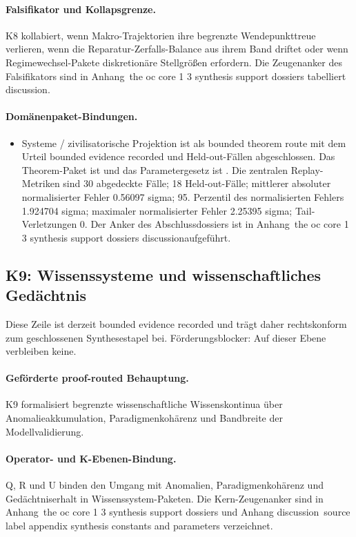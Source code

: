 \paragraph{Falsifikator und Kollapsgrenze.}
K8 kollabiert, wenn Makro-Trajektorien ihre begrenzte Wendepunkttreue verlieren, wenn die Reparatur-Zerfalls-Balance aus ihrem Band driftet oder wenn Regimewechsel-Pakete diskretionäre Stellgrößen erfordern.
Die Zeugenanker des Falsifikators sind in Anhang~the oc core 1 3 synthesis support dossiers tabelliert discussion.

\paragraph{Domänenpaket-Bindungen.}
\begin{itemize}[leftmargin=1.6em,nosep]
\item Systeme / zivilisatorische Projektion ist als bounded theorem route mit dem Urteil bounded evidence recorded und  Held-out-Fällen abgeschlossen. Das Theorem-Paket ist  und das Parametergesetz ist . Die zentralen Replay-Metriken sind 30 abgedeckte Fälle; 18 Held-out-Fälle; mittlerer absoluter normalisierter Fehler 0.56097 sigma; 95. Perzentil des normalisierten Fehlers 1.924704 sigma; maximaler normalisierter Fehler 2.25395 sigma; Tail-Verletzungen 0. Der Anker des Abschlussdossiers ist in Anhang~the oc core 1 3 synthesis support dossiers discussionaufgeführt.
\end{itemize}

\subsection{K9: Wissenssysteme und wissenschaftliches Gedächtnis}
\label{sec:oc-core-1-3-synthesis-k9}
Diese Zeile ist derzeit bounded evidence recorded und trägt daher rechtskonform zum geschlossenen Synthesestapel bei.
Förderungsblocker: Auf dieser Ebene verbleiben keine.

\paragraph{Geförderte proof-routed Behauptung.}
K9 formalisiert begrenzte wissenschaftliche Wissenskontinua über Anomalieakkumulation, Paradigmenkohärenz und Bandbreite der Modellvalidierung.

\paragraph{Operator- und K-Ebenen-Bindung.}
Q, R und U binden den Umgang mit Anomalien, Paradigmenkohärenz und Gedächtniserhalt in Wissenssystem-Paketen.
Die Kern-Zeugenanker sind in Anhang~the oc core 1 3 synthesis support dossiers und Anhang discussion~source label appendix synthesis constants and parameters verzeichnet.

